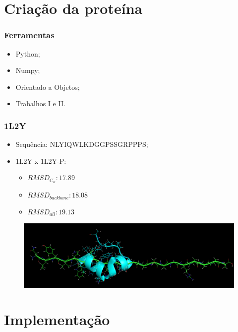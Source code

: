 \documentclass{beamer}
\begin{document}
\section{Criação da proteína} %

\begin{frame}
\frametitle{Ferramentas}
\begin{itemize}
\item Python;
\item Numpy;
\item Orientado a Objetos;
\item Trabalhos I e II.
\end{itemize}
\end{frame}

\begin{frame}
\frametitle{1L2Y}
\begin{itemize}
\item Sequência: NLYIQWLKDGGPSSGRPPPS;
\item 1L2Y x 1L2Y-P:
\begin{itemize}
  \item $RMSD_{C_\alpha}: 17.89$
  \item $RMSD_{backbone}: 18.08$
  \item $RMSD_{all}: 19.13$ 
\end{itemize}
\end{itemize}
\begin{figure}
\includegraphics[width=0.7\linewidth]{1L2Y.png}
\end{figure}
\end{frame}

\section{Implementação} %
\end{document}
